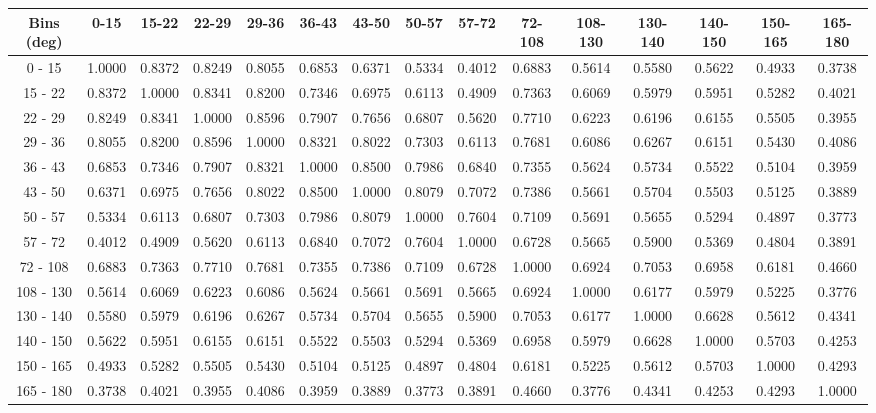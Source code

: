 \documentclass[aps, prd, reprint,showpacs,  preprintnumbers,amsmath,amssymb,superscriptaddress, nofootinbib]{revtex4-1}
\makeatletter
\renewenvironment{table}
  {\def\@captype{table}}
  {}
\makeatother
\begin{document}
\vspace{1cm}


\begin{table}
\centering
\begin{tabular}{ccccccccccccccc}
\hline
Bins (deg) & 0-15 & 15-22 & 22-29 & 29-36 & 36-43 & 43-50 & 50-57 & 57-72 & 72-108 & 108-130 & 130-140 & 140-150 & 150-165 & 165-180 \\ 
\hline
0 - 15 & 1.0000 & 0.8372 & 0.8249 & 0.8055 & 0.6853 & 0.6371 & 0.5334 & 0.4012 & 0.6883 & 0.5614 & 0.5580 & 0.5622 & 0.4933 & 0.3738 \\ 
15 - 22 & 0.8372 & 1.0000 & 0.8341 & 0.8200 & 0.7346 & 0.6975 & 0.6113 & 0.4909 & 0.7363 & 0.6069 & 0.5979 & 0.5951 & 0.5282 & 0.4021 \\ 
22 - 29 & 0.8249 & 0.8341 & 1.0000 & 0.8596 & 0.7907 & 0.7656 & 0.6807 & 0.5620 & 0.7710 & 0.6223 & 0.6196 & 0.6155 & 0.5505 & 0.3955 \\ 
29 - 36 & 0.8055 & 0.8200 & 0.8596 & 1.0000 & 0.8321 & 0.8022 & 0.7303 & 0.6113 & 0.7681 & 0.6086 & 0.6267 & 0.6151 & 0.5430 & 0.4086 \\ 
36 - 43 & 0.6853 & 0.7346 & 0.7907 & 0.8321 & 1.0000 & 0.8500 & 0.7986 & 0.6840 & 0.7355 & 0.5624 & 0.5734 & 0.5522 & 0.5104 & 0.3959 \\ 
43 - 50 & 0.6371 & 0.6975 & 0.7656 & 0.8022 & 0.8500 & 1.0000 & 0.8079 & 0.7072 & 0.7386 & 0.5661 & 0.5704 & 0.5503 & 0.5125 & 0.3889 \\ 
50 - 57 & 0.5334 & 0.6113 & 0.6807 & 0.7303 & 0.7986 & 0.8079 & 1.0000 & 0.7604 & 0.7109 & 0.5691 & 0.5655 & 0.5294 & 0.4897 & 0.3773 \\ 
57 - 72 & 0.4012 & 0.4909 & 0.5620 & 0.6113 & 0.6840 & 0.7072 & 0.7604 & 1.0000 & 0.6728 & 0.5665 & 0.5900 & 0.5369 & 0.4804 & 0.3891 \\ 
72 - 108 & 0.6883 & 0.7363 & 0.7710 & 0.7681 & 0.7355 & 0.7386 & 0.7109 & 0.6728 & 1.0000 & 0.6924 & 0.7053 & 0.6958 & 0.6181 & 0.4660 \\ 
108 - 130 & 0.5614 & 0.6069 & 0.6223 & 0.6086 & 0.5624 & 0.5661 & 0.5691 & 0.5665 & 0.6924 & 1.0000 & 0.6177 & 0.5979 & 0.5225 & 0.3776 \\ 
130 - 140 & 0.5580 & 0.5979 & 0.6196 & 0.6267 & 0.5734 & 0.5704 & 0.5655 & 0.5900 & 0.7053 & 0.6177 & 1.0000 & 0.6628 & 0.5612 & 0.4341 \\ 
140 - 150 & 0.5622 & 0.5951 & 0.6155 & 0.6151 & 0.5522 & 0.5503 & 0.5294 & 0.5369 & 0.6958 & 0.5979 & 0.6628 & 1.0000 & 0.5703 & 0.4253 \\ 
150 - 165 & 0.4933 & 0.5282 & 0.5505 & 0.5430 & 0.5104 & 0.5125 & 0.4897 & 0.4804 & 0.6181 & 0.5225 & 0.5612 & 0.5703 & 1.0000 & 0.4293 \\ 
165 - 180 & 0.3738 & 0.4021 & 0.3955 & 0.4086 & 0.3959 & 0.3889 & 0.3773 & 0.3891 & 0.4660 & 0.3776 & 0.4341 & 0.4253 & 0.4293 & 1.0000 \\ 
\hline
\hline
\end{tabular}
\caption{Correlation matrix for bins of $d\sigma/d\theta_\pi$.}
\label{tb:pip_theta_cov}
\end{table}
\end{document}
